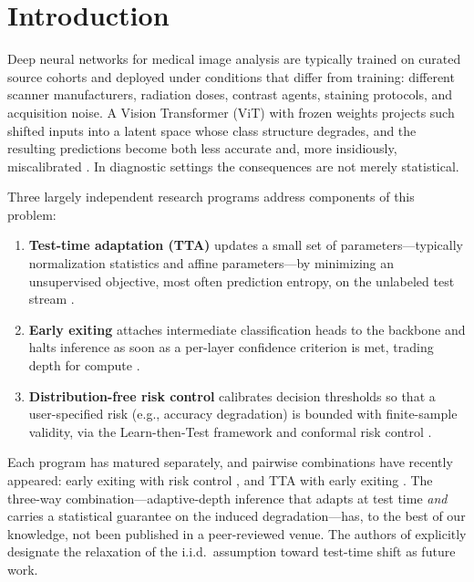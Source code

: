 \documentclass[preprint,12pt]{elsarticle}
\begin{document}
\section{Introduction}
\label{sec:intro}

Deep neural networks for medical image analysis are typically trained on curated source cohorts and deployed under conditions that differ from training: different scanner manufacturers, radiation doses, contrast agents, staining protocols, and acquisition noise. A Vision Transformer (ViT) with frozen weights projects such shifted inputs into a latent space whose class structure degrades, and the resulting predictions become both less accurate and, more insidiously, miscalibrated \citep{geifman2017selective,mehrtens2023pitfalls}. In diagnostic settings the consequences are not merely statistical.

Three largely independent research programs address components of this problem:

\begin{enumerate}
\item \textbf{Test-time adaptation (TTA)} updates a small set of parameters---typically normalization statistics and affine parameters---by minimizing an unsupervised objective, most often prediction entropy, on the unlabeled test stream \citep{wang2021tent,liang2020shot,niu2022eata,niu2023sar}.
\item \textbf{Early exiting} attaches intermediate classification heads to the backbone and halts inference as soon as a per-layer confidence criterion is met, trading depth for compute \citep{meng2022adavit,yin2022avit,xu2023lgvit,bajpai2025beem}.
\item \textbf{Distribution-free risk control} calibrates decision thresholds so that a user-specified risk (e.g., accuracy degradation) is bounded with finite-sample validity, via the Learn-then-Test framework \citep{angelopoulos2025ltt} and conformal risk control \citep{angelopoulos2024crc}.
\end{enumerate}

Each program has matured separately, and pairwise combinations have recently appeared: early exiting with risk control \citep{schuster2022calm,jazbec2024fast}, and TTA with early exiting \citep{jia2024tinytta}. The three-way combination---adaptive-depth inference that adapts at test time \emph{and} carries a statistical guarantee on the induced degradation---has, to the best of our knowledge, not been published in a peer-reviewed venue. The authors of \citet{jazbec2024fast} explicitly designate the relaxation of the i.i.d.\ assumption toward test-time shift as future work.
\end{document}
